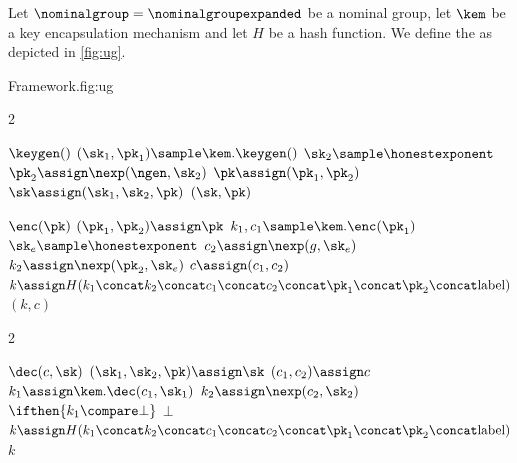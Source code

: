 \begin{definition}[\ug] \label{def:ug}
    Let $\nominalgroup = \nominalgroupexpanded$ be a nominal group, let
    $\kem$ be a key encapsulation mechanism and let $H$ be a hash function.
    We define the \ug \kem as depicted in \autoref{fig:ug}.
    \begin{gamefigure}{\ug Framework.}{fig:ug}
        \begin{games}{2}
            \begin{gameenv}{\algor $\keygen()$}
                \State $(\sk_1, \pk_1)  \sample \kem.\keygen()$
                \State $\sk_2 \sample \honestexponent$
                \State $\pk_2 \assign \nexp(\ngen, \sk_2)$
                \State $\pk \assign (\pk_1, \pk_2)$
                \State $\sk \assign (\sk_1, \sk_2, \pk)$
                \State \Return $(\sk, \pk)$
            \end{gameenv}
            \columnbreak
            \begin{gameenv}{\algor $\enc(\pk)$}
                \State $(\pk_1, \pk_2) \assign \pk$
                \State $k_1, c_1 \sample \kem.\enc(\pk_1)$
                \State $\sk_e \sample \honestexponent$
                \State $c_2 \assign \nexp(g, \sk_e)$
                \State $k_2 \assign \nexp(\pk_2, \sk_e)$
                \State $c \assign (c_1, c_2)$
                \State $k \assign H(k_1 \concat k_2 \concat c_1 \concat c_2 \concat \pk_1 \concat \pk_2 \concat \text{label})$
                \State \Return $(k, c)$
            \end{gameenv}
        \end{games}

        \begin{games}{2}
            \begin{gameenv}{\algor $\dec(c, \sk)$}
                \State $(\sk_1, \sk_2, \pk) \assign \sk$
                \State $(c_1, c_2) \assign c$
                \State $k_1 \assign \kem.\dec(c_1, \sk_1)$
                \State $k_2 \assign \nexp(c_2, \sk_2)$
                \State $\ifthen{k_1 \compare \bot}$
                \State \quad \Return $\bot$
                \State $k \assign H(k_1 \concat k_2 \concat c_1 \concat c_2 \concat \pk_1 \concat \pk_2 \concat \text{label})$
                \State \Return $k$
                \end{gameenv}
                \gamebreak
                \emptygame
            \end{games}
        \end{gamefigure}

    \end{definition}

